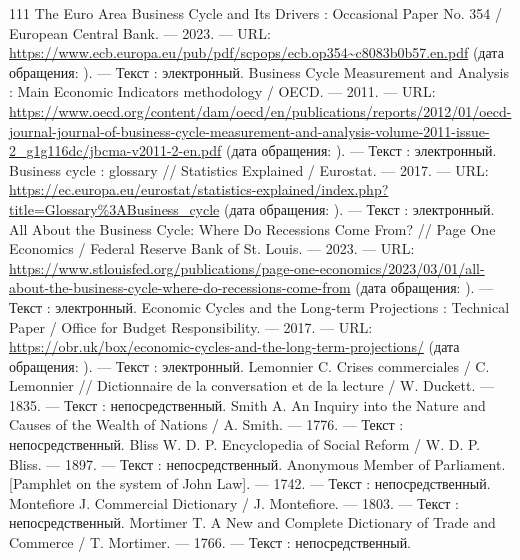 \begin{RaggedRight}
\begin{thebibliography}{111}
     \hypertarget{bib:ECB-2023}{} The Euro Area Business Cycle and Its Drivers : Occasional Paper No. 354 / European Central Bank. --- 2023. --- URL: \url{https://www.ecb.europa.eu/pub/pdf/scpops/ecb.op354~c8083b0b57.en.pdf} (дата обращения: \bibaccessdate). --- Текст : электронный.
     \hypertarget{bib:OECD-2011}{} Business Cycle Measurement and Analysis : Main Economic Indicators methodology / OECD. --- 2011. --- URL: \url{https://www.oecd.org/content/dam/oecd/en/publications/reports/2012/01/oecd-journal-journal-of-business-cycle-measurement-and-analysis-volume-2011-issue-2_g1g116dc/jbcma-v2011-2-en.pdf} (дата обращения: \bibaccessdate). --- Текст : электронный.
     \hypertarget{bib:Eurostat-2017}{} Business cycle : glossary // Statistics Explained / Eurostat. --- 2017. --- URL: \url{https://ec.europa.eu/eurostat/statistics-explained/index.php?title=Glossary%3ABusiness_cycle} (дата обращения: \bibaccessdate). --- Текст : электронный.
     \hypertarget{bib:FRED-2023}{} All About the Business Cycle: Where Do Recessions Come From? // Page One Economics / Federal Reserve Bank of St. Louis. --- 2023. --- URL: \url{https://www.stlouisfed.org/publications/page-one-economics/2023/03/01/all-about-the-business-cycle-where-do-recessions-come-from} (дата обращения: \bibaccessdate). --- Текст : электронный.
     \hypertarget{bib:OBR-2017}{} Economic Cycles and the Long-term Projections : Technical Paper / Office for Budget Responsibility. --- 2017. --- URL: \url{https://obr.uk/box/economic-cycles-and-the-long-term-projections/} (дата обращения: \bibaccessdate). --- Текст : электронный.
     \hypertarget{bib:Lemonnier-1835}{} Lemonnier C. Crises commerciales / C. Lemonnier // Dictionnaire de la conversation et de la lecture / W. Duckett. --- 1835. --- Текст : непосредственный.
     \hypertarget{bib:Smith-1776}{} Smith A. An Inquiry into the Nature and Causes of the Wealth of Nations / A. Smith. --- 1776. --- Текст : непосредственный.
     \hypertarget{bib:Bliss-1897}{} Bliss W. D. P. Encyclopedia of Social Reform / W. D. P. Bliss. --- 1897. --- Текст : непосредственный.
     \hypertarget{bib:Anonymous-1742}{} Anonymous Member of Parliament. [Pamphlet on the system of John Law]. --- 1742. --- Текст : непосредственный.
     \hypertarget{bib:Montefiore-1803}{} Montefiore J. Commercial Dictionary / J. Montefiore. --- 1803. --- Текст : непосредственный.
     \hypertarget{bib:Mortimer-1766}{} Mortimer T. A New and Complete Dictionary of Trade and Commerce / T. Mortimer. --- 1766. --- Текст : непосредственный.

\end{thebibliography}
\end{RaggedRight}

